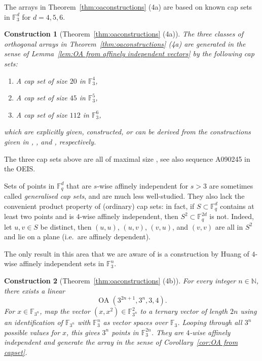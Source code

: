 \documentclass[11pt, letterpaper]{article}
\newtheorem{construction}{Construction}
\theoremstyle{definition}
\theoremstyle{remark}
\DeclareMathOperator{\OA}{OA}
\newcommand{\N}{\mathbb{N}}
\begin{document}
\begin{appendices}
The arrays in Theorem~\ref{thm:oaconstructions} (4a) are based on known cap sets in $\mathbb{F}_3^d$ for $d=4,5,6$.

\begin{construction}[Theorem~\ref{thm:oaconstructions} (4a)]
    The three classes of orthogonal arrays in Theorem~\ref{thm:oaconstructions} (4a) are generated in the sense of Lemma~\ref{lem:OA from affinely independent vectors} by the following cap sets:
    \begin{enumerate}
        \item[\textbullet] A cap set of size $20$ in $\mathbb{F}_3^4$,
        \item[\textbullet] A cap set of size $45$ in $\mathbb{F}_3^5$,
        \item[\textbullet] A cap set of size $112$ in $\mathbb{F}_3^6$,
    \end{enumerate}
    which are explicitly given, constructed, or can be derived from the constructions given in \cite[Fig.\ 1]{hill83}, \cite[Section 2]{hill73}, and \cite{potechin2008}, respectively.
\end{construction}
The three cap sets above are all of maximal size \cite{hill83,hill73,potechin2008}, see also sequence A090245 in the OEIS.

Sets of points in $\mathbb{F}_q^d$ that are $s$-wise affinely independent for $s > 3$ are sometimes called \emph{generalised cap sets}, and are much less well-studied. They also lack the convenient product property of (ordinary) cap sets: in fact, if $S \subset \mathbb{F}_q^d$ contains at least two points and is $4$-wise affinely independent, then $S^2 \subset \mathbb{F}_q^{2d}$ is not. Indeed, let $u,v \in S$ be distinct, then $(u,u)$, $(u,v)$, $(v,u)$, and $(v,v)$ are all in $S^2$ and lie on a plane (i.e.\ are affinely dependent).

The only result in this area that we are aware of is a construction by Huang \cite{huang2019} of $4$-wise affinely independent sets in $\mathbb{F}_3^n$.

\begin{construction}[Theorem~\ref{thm:oaconstructions} (4b)]
    For every integer $n\in \N$, there exists a linear \[
    \OA(3^{2n+1}, 3^n, 3, 4).
    \] For $x\in \mathbb{F}_{3^n}$, map the vector $(x,x^2) \in \mathbb{F}_{3^n}^2$ to a ternary vector of length $2n$ using an identification of $\mathbb{F}_{3^n}$ with $\mathbb{F}_3^n$ as vector spaces over $\mathbb{F}_3$. Looping through all $3^n$ possible values for $x$, this gives $3^n$ points in $\mathbb{F}_3^{2n}$. They are $4$-wise affinely independent \cite{huang2019} and generate the array in the sense of Corollary~\ref{cor:OA from capset}.
\end{construction}


\end{appendices}
\end{document}
